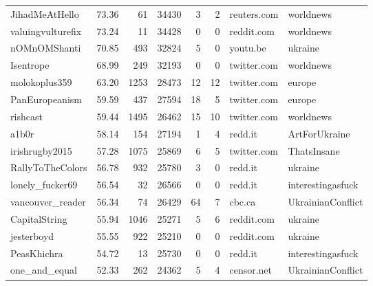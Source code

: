 \begin{tabular}{lrrrrrll}
JihadMeAtHello    &      73.36 &      61 &    34430 &           3 &           2 &          reuters.com &             worldnews \\
valuingvulturefix &      73.24 &      11 &    34428 &           0 &           0 &           reddit.com &             worldnews \\
nOMnOMShanti      &      70.85 &     493 &    32824 &           5 &           0 &             youtu.be &               ukraine \\
Isentrope         &      68.99 &     249 &    32193 &           0 &           0 &          twitter.com &             worldnews \\
molokoplus359     &      63.20 &    1253 &    28473 &          12 &          12 &          twitter.com &                europe \\
PanEuropeanism    &      59.59 &     437 &    27594 &          18 &           5 &          twitter.com &                europe \\
rishcast          &      59.44 &    1495 &    26462 &          15 &          10 &          twitter.com &             worldnews \\
a1b0r             &      58.14 &     154 &    27194 &           1 &           4 &              redd.it &         ArtForUkraine \\
irishrugby2015    &      57.28 &    1075 &    25869 &           6 &           5 &          twitter.com &           ThatsInsane \\
RallyToTheColors  &      56.78 &     932 &    25780 &           3 &           0 &              redd.it &               ukraine \\
lonely\_fucker69   &      56.54 &      32 &    26566 &           0 &           0 &              redd.it &     interestingasfuck \\
vancouver\_reader  &      56.34 &      74 &    26429 &          64 &           7 &               cbc.ca &     UkrainianConflict \\
CapitalString     &      55.94 &    1046 &    25271 &           5 &           6 &           reddit.com &               ukraine \\
jesterboyd        &      55.55 &     922 &    25210 &           0 &           0 &           reddit.com &               ukraine \\
PeasKhichra       &      54.72 &      13 &    25730 &           0 &           0 &              redd.it &     interestingasfuck \\
one\_and\_equal     &      52.33 &     262 &    24362 &           5 &           4 &           censor.net &     UkrainianConflict \\
\bottomrule
\end{tabular}
